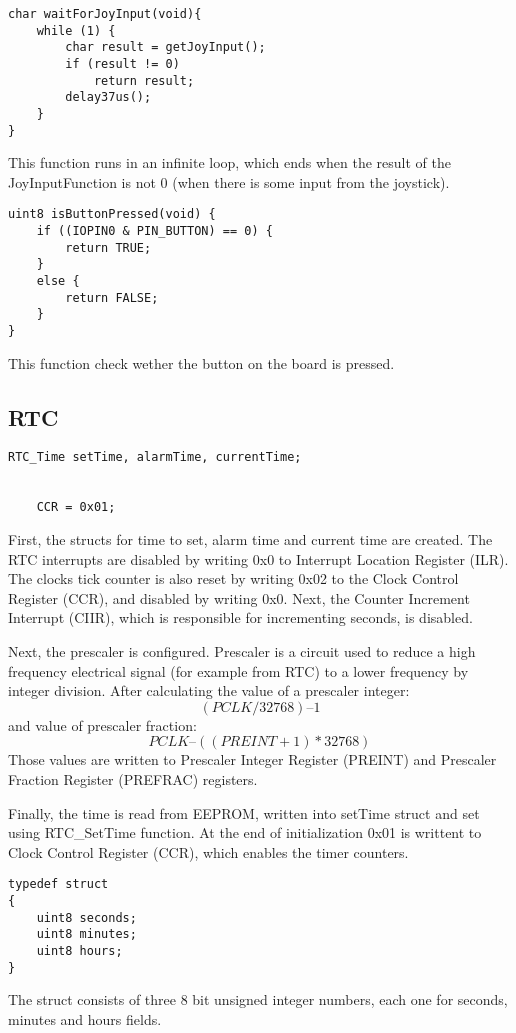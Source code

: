 \documentclass[11pt]{article}
\begin{document}
	\begin{lstlisting}[caption = {Await joystick input function}]
char waitForJoyInput(void){
	while (1) {
		char result = getJoyInput();
		if (result != 0)
			return result;
		delay37us();
	}
}
	\end{lstlisting}
This function runs in an infinite loop, which ends when the result of the JoyInputFunction is not 0 (when there is some input from the joystick).

	\begin{lstlisting}[caption = {Get button input function}]
uint8 isButtonPressed(void) {
	if ((IOPIN0 & PIN_BUTTON) == 0) {
		return TRUE;
	}
	else {
		return FALSE;
	}
}
	\end{lstlisting}
This function check wether the button on the board is pressed.

    \subsection{RTC}
	\begin{lstlisting}[caption = {RTC initialization}]
	RTC_Time setTime, alarmTime, currentTime;


    CCR = 0x01;
	\end{lstlisting}

	First, the structs for time to set, alarm time and current time are created. The RTC interrupts are disabled by writing 0x0 to Interrupt Location Register (ILR).  The clocks tick counter is also reset by writing 0x02 to the Clock Control Register (CCR), and disabled by writing 0x0. Next, the Counter Increment Interrupt (CIIR), which is responsible for incrementing seconds, is disabled. 

Next, the prescaler is configured. Prescaler is a circuit used to reduce a high frequency electrical signal (for example from RTC) to a lower frequency by integer division. After calculating the value of a prescaler integer:
\[ (PCLK/32768) – 1 \]
and value of prescaler fraction:
\[ PCLK – ((PREINT + 1) * 32768) \]
Those values are written to Prescaler Integer Register (PREINT) and Prescaler Fraction Register (PREFRAC) registers.

Finally, the time is read from EEPROM, written into setTime struct and set using RTC\_SetTime function. At the end of initialization 0x01 is writtent to Clock Control Register (CCR), which enables the timer counters.

	\begin{lstlisting}[caption = {RTC struct}]
typedef struct
{
	uint8 seconds;
	uint8 minutes;
	uint8 hours;
} 
	\end{lstlisting}
	The struct consists of three 8 bit unsigned integer numbers, each one for seconds, minutes and hours fields.
\end{document}
